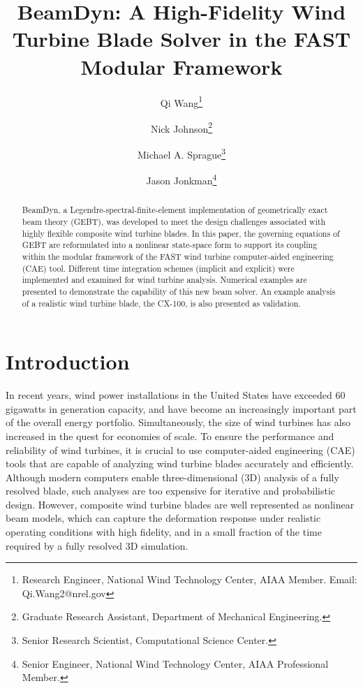 \documentclass{aiaa-tc}
\title{BeamDyn: A High-Fidelity Wind Turbine Blade Solver in the FAST
Modular Framework}
\author[1]{Qi Wang\thanks{Research Engineer, National Wind Technology Center, AIAA Member. Email: Qi.Wang2@nrel.gov}}
\author[2]{Nick Johnson\thanks{Graduate Research Assistant, Department of
Mechanical Engineering.}}
\author[1]{Michael A. Sprague\thanks{Senior Research Scientist, 
Computational Science Center.}}
\author[1]{Jason Jonkman\thanks{Senior Engineer, National Wind Technology Center, AIAA Professional Member.}}
\affil[1]{National Renewable Energy Laboratory, Golden, CO 80401}
\affil[2]{Colorado School of Mines, Golden, CO 80401}
\begin{document}
\maketitle

\begin{abstract}
{BeamDyn, a Legendre-spectral-finite-element implementation of geometrically
exact beam theory (GEBT), was developed to meet the design challenges
associated with highly flexible composite wind turbine blades. In this
paper, the governing equations of GEBT are reformulated into a nonlinear
state-space form to support its coupling within the
modular framework of the FAST wind turbine
computer-aided engineering (CAE) tool. Different time integration
schemes (implicit and explicit) were implemented and examined for wind
turbine analysis.  Numerical examples are presented to demonstrate the capability of this new beam solver. An example analysis of a realistic wind turbine blade, the CX-100, is also presented as validation.}     
\end{abstract}

\section{Introduction} In recent years, wind power installations in the United States have exceeded 60
gigawatts in generation capacity, and have become an increasingly important part of the overall energy
portfolio. Simultaneously, the size of wind turbines has also increased in
the quest for economies of scale.   To ensure the performance and
reliability of wind turbines, it is crucial to use computer-aided engineering (CAE) tools that are capable of analyzing wind
turbine blades accurately and efficiently. Although modern
computers enable three-dimensional (3D) analysis
of a fully resolved blade, such analyses are too
expensive for iterative and probabilistic design. However, composite wind
turbine blades are well represented as nonlinear beam models, which can
capture the deformation response under realistic
operating conditions with high fidelity, and in a small fraction of the time required by a
fully resolved 3D simulation. 
\end{document}
